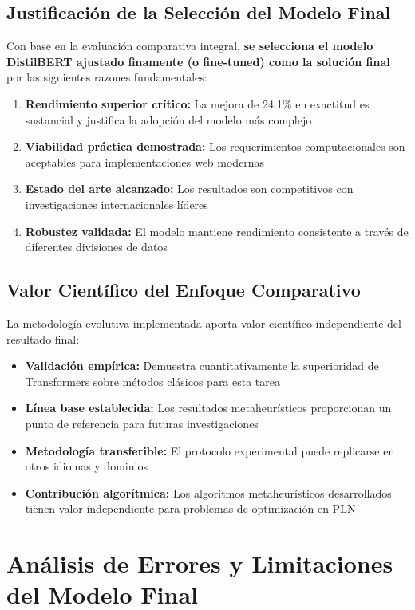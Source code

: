 \subsection{Justificación de la Selección del Modelo Final}

Con base en la evaluación comparativa integral, \textbf{se selecciona el modelo DistilBERT ajustado finamente (o fine-tuned) como la solución final} por las siguientes razones fundamentales:

\begin{enumerate}
    \item \textbf{Rendimiento superior crítico:} La mejora de 24.1\% en exactitud es sustancial y justifica la adopción del modelo más complejo
    \item \textbf{Viabilidad práctica demostrada:} Los requerimientos computacionales son aceptables para implementaciones web modernas
    \item \textbf{Estado del arte alcanzado:} Los resultados son competitivos con investigaciones internacionales líderes
    \item \textbf{Robustez validada:} El modelo mantiene rendimiento consistente a través de diferentes divisiones de datos
\end{enumerate}

\subsection{Valor Científico del Enfoque Comparativo}

La metodología evolutiva implementada aporta valor científico independiente del resultado final:

\begin{itemize}
    \item \textbf{Validación empírica:} Demuestra cuantitativamente la superioridad de Transformers sobre métodos clásicos para esta tarea
    \item \textbf{Línea base establecida:} Los resultados metaheurísticos proporcionan un punto de referencia para futuras investigaciones
    \item \textbf{Metodología transferible:} El protocolo experimental puede replicarse en otros idiomas y dominios
    \item \textbf{Contribución algorítmica:} Los algoritmos metaheurísticos desarrollados tienen valor independiente para problemas de optimización en PLN
\end{itemize}

\section{Análisis de Errores y Limitaciones del Modelo Final}
\label{sec:analisis_errores_limitaciones}

